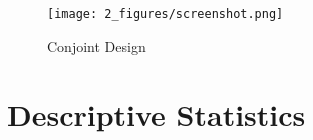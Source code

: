 \documentclass[12pt,oneside,smallheadings,chapterprefix=true]{article}
\begin{document}
\begin{figure}[hbt!]
\texttt{[image: 2\_figures/screenshot.png]}
\caption{Conjoint Design}
\label{fig:conjoint}

\end{figure}



\newpage




\clearpage
\section{Descriptive Statistics}  

\end{document}
